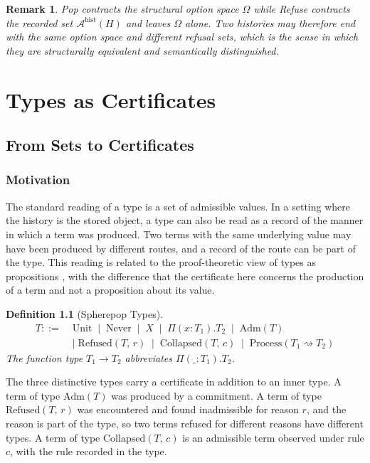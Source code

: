 \documentclass[12pt,oneside,openany]{book}
\theoremstyle{spherepop}
\newtheorem{definition}{Definition}[chapter]
\theoremstyle{remarkstyle}
\newtheorem{remark}[definition]{Remark}
\newcommand{\Adm}[1]{\mathrm{Adm}(#1)}
\newcommand{\Refused}[2]{\mathrm{Refused}(#1,\,#2)}
\newcommand{\Collapsed}[2]{\mathrm{Collapsed}(#1,\,#2)}
\newcommand{\yields}{\rightsquigarrow}
\newcommand{\calA}{\mathcal{A}}
\begin{document}
\begin{remark}
Pop contracts the structural option space $\Omega$ while Refuse contracts the recorded set $\calA^{\mathrm{hist}}(H)$ and leaves $\Omega$ alone. Two histories may therefore end with the same option space and different refusal sets, which is the sense in which they are structurally equivalent and semantically distinguished.
\end{remark}

\part{Types as Certificates}

\chapter{From Sets to Certificates}
\label{ch:certs}

\section{Motivation}

The standard reading of a type is a set of admissible values. In a setting where the history is the stored object, a type can also be read as a record of the manner in which a term was produced. Two terms with the same underlying value may have been produced by different routes, and a record of the route can be part of the type. This reading is related to the proof-theoretic view of types as propositions \cite{martinlof}, with the difference that the certificate here concerns the production of a term and not a proposition about its value.

\begin{definition}[Spherepop Types]
\label{def:types}
\begin{align*}
T ::= \;& \mathrm{Unit}\;\mid\;\mathrm{Never}\;\mid\;X\;\mid\;\Pi(x:T_1).T_2\;\mid\;\Adm{T}\\ &\mid\;\Refused{T}{r}\;\mid\;\Collapsed{T}{c}\;\mid\;\mathrm{Process}(T_1\yields T_2)
\end{align*}
The function type $T_1\to T_2$ abbreviates $\Pi(\_:T_1).T_2$.
\end{definition}

The three distinctive types carry a certificate in addition to an inner type. A term of type $\Adm{T}$ was produced by a commitment. A term of type $\Refused{T}{r}$ was encountered and found inadmissible for reason $r$, and the reason is part of the type, so two terms refused for different reasons have different types. A term of type $\Collapsed{T}{c}$ is an admissible term observed under rule $c$, with the rule recorded in the type.
\end{document}
